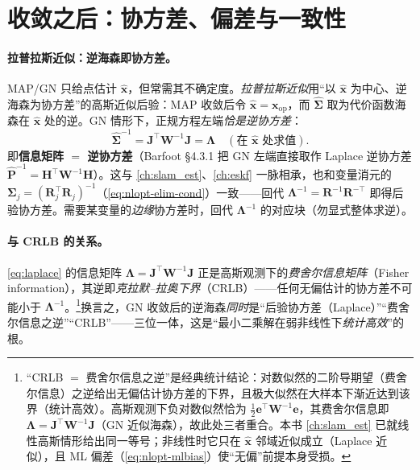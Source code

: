 \section{收敛之后：协方差、偏差与一致性}
\label{sec:nlopt-cov}

\paragraph{拉普拉斯近似：逆海森即协方差。}\cite{barfoot2024state}
MAP/GN 只给点估计 $\hat{\mathbf{x}}$，但常需其不确定度。\emph{拉普拉斯近似}用“以 $\hat{\mathbf{x}}$ 为中心、逆海森为协方差”的高斯近似后验：MAP 收敛后令 $\hat{\mathbf{x}}=\mathbf{x}_{\mathrm{op}}$，而 $\hat{\boldsymbol{\Sigma}}$ 取为代价函数海森在 $\hat{\mathbf{x}}$ 处的逆。GN 情形下，正规方程左端\emph{恰是逆协方差}：
\begin{equation}
  \hat{\boldsymbol{\Sigma}}^{-1}=\mathbf{J}^\top\mathbf{W}^{-1}\mathbf{J}=\boldsymbol{\Lambda}\quad(\text{在 }\hat{\mathbf{x}}\text{ 处求值}).
  \label{eq:laplace}
\end{equation}
即\textbf{信息矩阵 $=$ 逆协方差}（Barfoot\cite{barfoot2024state} §4.3.1 把 GN 左端直接取作 Laplace 逆协方差 $\hat{\mathbf{P}}^{-1}=\mathbf{H}^\top\mathbf{W}^{-1}\mathbf{H}$）。这与 \cref{ch:slam_est}、\cref{ch:eskf} 一脉相承，也和变量消元的 $\boldsymbol{\Sigma}_j=(\mathbf{R}_j^\top\mathbf{R}_j)^{-1}$（\cref{eq:nlopt-elim-cond}）一致——回代 $\boldsymbol{\Lambda}^{-1}=\mathbf{R}^{-1}\mathbf{R}^{-\top}$ 即得后验协方差。需要某变量的\emph{边缘}协方差时，回代 $\boldsymbol{\Lambda}^{-1}$ 的对应块（勿显式整体求逆）。

\paragraph{与 CRLB 的关系。}
\cref{eq:laplace} 的信息矩阵 $\boldsymbol{\Lambda}=\mathbf{J}^\top\mathbf{W}^{-1}\mathbf{J}$ 正是高斯观测下的\emph{费舍尔信息矩阵}（Fisher information），其逆即\emph{克拉默--拉奥下界}（CRLB）——任何无偏估计的协方差不可能小于 $\boldsymbol{\Lambda}^{-1}$。\footnote{“CRLB $=$ 费舍尔信息之逆”是经典统计结论：对数似然的二阶导期望（费舍尔信息）之逆给出无偏估计协方差的下界，且极大似然在大样本下渐近达到该界（统计高效）。高斯观测下负对数似然恰为 $\tfrac12\mathbf{e}^\top\mathbf{W}^{-1}\mathbf{e}$，其费舍尔信息即 $\boldsymbol{\Lambda}=\mathbf{J}^\top\mathbf{W}^{-1}\mathbf{J}$（GN 近似海森），故此处三者重合。本书 \cref{ch:slam_est} 已就线性高斯情形给出同一等号；非线性时它只在 $\hat{\mathbf{x}}$ 邻域近似成立（Laplace 近似），且 ML 偏差（\cref{eq:nlopt-mlbias}）使“无偏”前提本身受损。}换言之，GN 收敛后的逆海森\emph{同时}是“后验协方差（Laplace）”“费舍尔信息之逆”“CRLB”——三位一体，这是“最小二乘解在弱非线性下\emph{统计高效}”的根。

